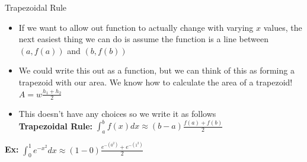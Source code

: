 {}\documentclass[letterpaper,
compress,
xcolor=x11names,
]{beamer}
\begin{document}

\begin{frame}{Trapezoidal Rule}
	\footnotesize
	\begin{itemize}
		\item If we want to allow out function to actually change with varying $x$ values, the next easiest thing we can do is assume the function is a line between $(a,f(a))$ and $(b,f(b))$
		\item We could write this out as a function, but we can think of this as forming a trapezoid with our area. We know how to calculate the area of a trapezoid! $A  = w\frac{h_1+h_2}{2}$ 
		\item This doesn't have any choices so we write it as follows\\
		\textbf{Trapezoidal Rule: } $\int_{a}^{b}f(x)dx\approx (b-a)\frac{f(a)+f(b)}{2}$
	\end{itemize}
	\begin{center}
		\textbf{Ex:} $\displaystyle \int_{0}^{1} e^{-x^2} dx\approx(1-0)\frac{e^{-(0^2)}+e^{-(1^2)}}{2}$ \hspace{0.5cm}
	\end{center}
\end{frame}

\end{document}
